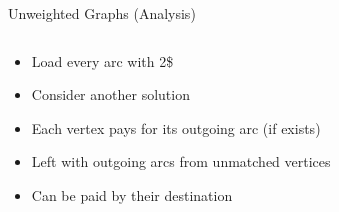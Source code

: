 \begin{frame}{Unweighted Graphs (Analysis)}
\begin{columns}
\begin{column}{.5\textwidth}
\begin{itemize}
  \item<1> Load every arc with 2\$
  \item<3> Consider another solution
  \item<4> Each vertex pays for its outgoing arc (if exists)
  \item<5> Left with outgoing arcs from unmatched vertices 
  \item<6> Can be paid by their destination 
\end{itemize}
\end{column}
\begin{column}{.5\textwidth}
\centering

\end{column}
\end{columns}
\end{frame}